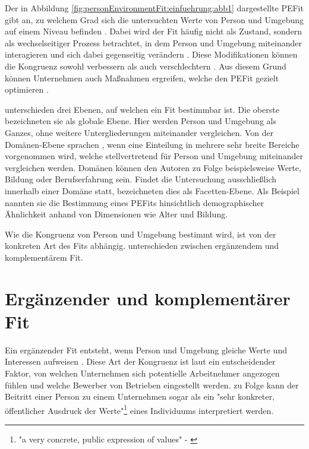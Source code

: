 Der in Abbildung \ref{fig:personEnvironmentFit:einfuehrung:abb1} dargestellte \ac{PEFit} gibt an, zu welchem Grad sich die untersuchten Werte von Person und Umgebung auf einem Niveau befinden \cite[S. 53]{edwards:2008}. Dabei wird der Fit häufig nicht als Zustand, sondern als wechselseitiger Prozess betrachtet, in dem Person und Umgebung miteinander interagieren und sich dabei gegenseitig verändern \cite[S. 10ff.]{su:2015}. Diese Modifikationen können die Kongruenz sowohl verbessern als auch verschlechtern \cite[S. 4]{caplan:1987}. Aus diesem Grund können Unternehmen auch Maßnahmen ergreifen, welche den \ac{PEFit} gezielt optimieren \cite[S. 16]{cable:2001}.

\textcite[S. 6ff.]{edwards:2007} unterschieden drei Ebenen, auf welchen ein Fit bestimmbar ist. Die oberste bezeichneten sie als globale Ebene. Hier werden Person und Umgebung als Ganzes, ohne weitere Untergliederungen miteinander vergleichen. Von der Domänen-Ebene sprachen \textcite[S. 7f.]{edwards:2007}, wenn eine Einteilung in mehrere sehr breite Bereiche vorgenommen wird, welche stellvertretend für Person und Umgebung miteinander vergleichen werden. Domänen können den Autoren zu Folge beispielsweise Werte, Bildung oder Berufserfahrung sein. Findet die Untersuchung ausschließlich innerhalb einer Domäne statt, bezeichneten \textcite[S. 7f.]{edwards:2007} dies als Facetten-Ebene. Als Beispiel nannten sie die Bestimmung eines \acp{PEFit} hinsichtlich demographischer Ähnlichkeit anhand von Dimensionen wie Alter und Bildung.

Wie die Kongruenz von Person und Umgebung bestimmt wird, ist von der konkreten Art des Fits abhängig. \textcite[S. 1]{muchinsky:1987} unterschieden zwischen ergänzendem und komplementärem Fit.

\section{Ergänzender und komplementärer Fit}
\label{ch:personEnvironmentFit:supplementaryUndComplementary}
Ein ergänzender Fit entsteht, wenn Person und Umgebung gleiche Werte und Interessen aufweisen \cite[S. 2ff.]{muchinsky:1987}. Diese Art der Kongruenz ist laut \textcite[S. 5ff.]{schneider:1987} ein entscheidender Faktor, von welchen Unternehmen sich potentielle Arbeitnehmer angezogen fühlen und welche Bewerber von Betrieben eingestellt werden. \textcite[S. 4, Z. 47f.]{popovich:1982} zu Folge kann der Beitritt einer Person zu einem Unternehmen sogar als ein "sehr konkreter, öffentlicher Ausdruck der Werte"\footnote{"a very concrete, public expression of values" - \textcite[S. 4, Z. 47f.]{popovich:1982}} eines Individuums interpretiert werden.

